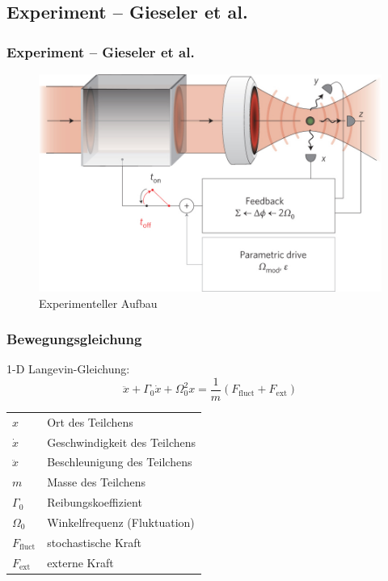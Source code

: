 \documentclass{beamer}
\begin{document}
\subsection{Experiment -- Gieseler et al.}
\begin{frame}
\frametitle{Experiment -- Gieseler et al.}
\begin{center}
\begin{figure}
\includegraphics[scale=0.3]{../images/experimental_setup.jpg}
\caption{Experimenteller Aufbau \cite{Gieseler2014}}
\end{figure}
\end{center}
\end{frame}

\begin{frame}
\frametitle{Bewegungsgleichung}
1-D Langevin-Gleichung:
\begin{equation}
    \label{eq:langevin}
    \ddot{x} + \Gamma_0 \dot{x} + \Omega^2_0x = \frac 1 m \left(F_\text{fluct} + F_\text{ext}\right)
\end{equation}
\begin{tabular}{l l}
$x$ & Ort des Teilchens\\
$\dot{x}$ & Geschwindigkeit des Teilchens\\
$\ddot{x}$ & Beschleunigung des Teilchens\\
$m$ & Masse des Teilchens\\
$\Gamma_0$ & Reibungskoeffizient\\
$\Omega_0$ & Winkelfrequenz (Fluktuation)\\
$F_\text{fluct}$ & stochastische Kraft\\
$F_\text{ext}$ & externe Kraft
\end{tabular}
\end{frame}
\end{document}
